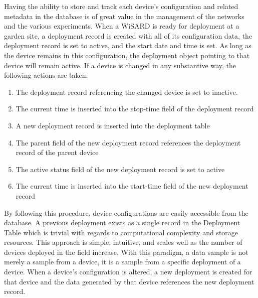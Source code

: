 

Having the ability to store and track each device's configuration and related metadata in the database is of great value in the management of the networks and the various experiments. When a WiSARD is ready for deployment at a garden site, a deployment record is created with all of its configuration data, the deployment record is set to active, and the start date and time is set. As long as the device remains in this configuration, the deployment object pointing to that device will remain active. If a device is changed in any substantive way, the following actions are taken:

\begin{enumerate}
	\item The deployment record referencing the changed device is set to inactive.
	\item The current time is inserted into the stop-time field of the deployment record
	\item A new deployment record is inserted into the deployment table
	\item The parent field of the new deployment record references the deployment record of the parent device
	\item The active status field of the new deployment record is set to active
	\item The current time is inserted into the start-time field of the new deployment record
\end{enumerate}

By following this procedure, device configurations are easily accessible from the database. A previous deployment exists as a single record in the Deployment Table which is trivial with regards to computational complexity and storage resources. This approach is simple, intuitive, and scales well as the number of devices deployed in the field increase. With this paradigm, a data sample is not merely a sample from a device,  it is a sample from a specific deployment of a device. When a device's configuration is altered, a new deployment is created for that device and the data generated by that device references the new deployment record.

